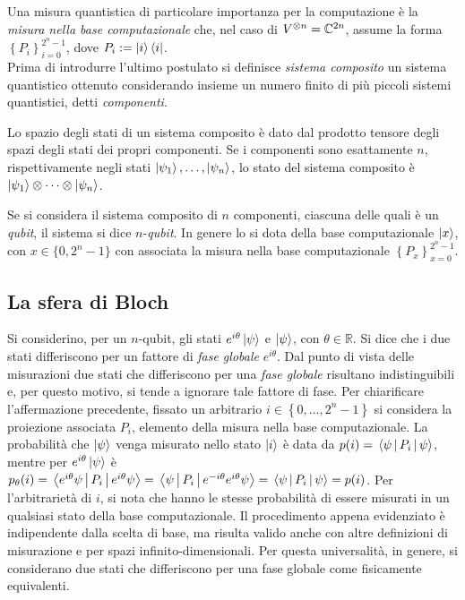 Una misura quantistica di particolare importanza per la computazione è la \textit{misura nella base computazionale} che, nel caso di $V^{\otimes n} = \mathbb{C}^{2n}$, assume la forma $\left\{P_i \right\}_{i=0}^{2^n-1}$, dove $P_i := \ket{i}\bra{i}$.
\\

Prima di introdurre l'ultimo postulato si definisce \textit{sistema composito} un sistema quantistico ottenuto considerando insieme un numero finito di più piccoli sistemi quantistici, detti \textit{componenti}.

\begin{post}\label{post:mq4}
 Lo spazio degli stati di un sistema composito è dato dal {\upshape prodotto tensore} degli spazi degli stati dei propri componenti. Se i componenti sono esattamente $n$, rispettivamente negli stati $\ket{\psi_1}, \dots, \ket{\psi_n}$, lo stato del sistema composito è $\ket{\psi_1} \otimes \dots \otimes \ket{\psi_n}$.
\end{post}
Se si considera il sistema composito di $n$ componenti, ciascuna delle quali è un \textit{qubit}, il sistema si dice $n$-\textit{qubit}.
In genere lo si dota della base computazionale $\ket{x}$, con $x \in \{0,2^n-1\}$ con associata la misura nella base computazionale $\left\{P_x \right\}_{x=0}^{2^n-1}$.

\subsection{La sfera di Bloch}
Si considerino, per un $n$-qubit, gli stati $e^{i\theta}\ket{\psi}$ e $\ket{\psi}$, con $\theta \in \mathbb{R}$.
Si dice che i due stati differiscono per un fattore di \textit{fase globale} $e^{i\theta}$.
Dal punto di vista delle misurazioni due stati che differiscono per una \textit{fase globale} risultano indistinguibili e, per questo motivo, si tende a ignorare tale fattore di fase.
Per chiarificare l'affermazione precedente, fissato un arbitrario $i \in \left\{0, \dots, 2^n-1 \right\}$ si considera la proiezione associata $P_i$, elemento della misura nella base computazionale.
La probabilità che $\ket{\psi}$ venga misurato nello stato $\ket{i}$ è data da $p(i) = \mel{\psi\,}{\, P_i \,}{\, \psi}$, mentre per $e^{i\theta}\ket{\psi}$ è $p_\theta(i) = \mel{e^{i\theta}\psi\,}{\, P_i \,}{\, e^{i\theta}\psi} = \mel{\psi\,}{\, P_i \,}{\, e^{-i\theta}e^{i\theta}\psi} = \mel{\psi\,}{\, P_i \,}{\, \psi} = p(i)$.
Per l'arbitrarietà di $i$, si nota che hanno le stesse probabilità di essere misurati in un qualsiasi stato della base computazionale.
Il procedimento appena evidenziato è indipendente dalla scelta di base, ma risulta valido anche con altre definizioni di misurazione e per spazi infinito-dimensionali.
Per questa universalità, in genere, si considerano due stati che differiscono per una fase globale come fisicamente equivalenti.

